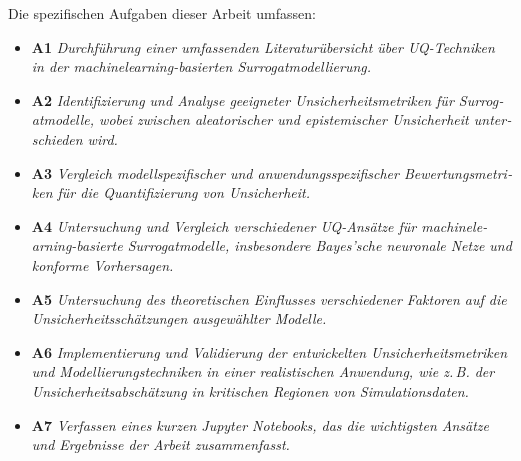 \begin{otherlanguage}{ngerman}
Die spezifischen Aufgaben dieser Arbeit umfassen:

\begin{itemize}
  \item \textbf{A1} \textit{Durchführung einer umfassenden Literaturübersicht über UQ-Techniken in der \gls{machinelearning}-basierten Surrogatmodellierung.}
  \item \textbf{A2} \textit{Identifizierung und Analyse geeigneter Unsicherheitsmetriken für Surrogatmodelle, wobei zwischen aleatorischer und epistemischer Unsicherheit unterschieden wird.}
  \item \textbf{A3} \textit{Vergleich modellspezifischer und anwendungsspezifischer Bewertungsmetriken für die Quantifizierung von Unsicherheit.}
  \item \textbf{A4} \textit{Untersuchung und Vergleich verschiedener UQ-Ansätze für \gls{machinelearning}-basierte Surrogatmodelle, insbesondere Bayes'sche neuronale Netze und konforme Vorhersagen.}
  \item \textbf{A5} \textit{Untersuchung des theoretischen Einflusses verschiedener Faktoren auf die Unsicherheitsschätzungen ausgewählter Modelle.}
  \item \textbf{A6} \textit{Implementierung und Validierung der entwickelten Unsicherheitsmetriken und Modellierungstechniken in einer realistischen Anwendung, wie z.\,B. der Unsicherheitsabschätzung in kritischen Regionen von Simulationsdaten.}
  \item \textbf{A7} \textit{Verfassen eines kurzen Jupyter Notebooks, das die wichtigsten Ansätze und Ergebnisse der Arbeit zusammenfasst.}
\end{itemize}
\end{otherlanguage}
